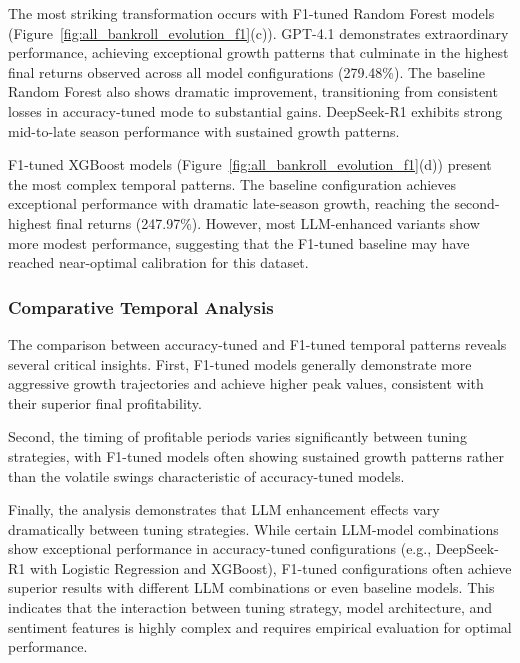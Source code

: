 \documentclass[conference]{IEEEtran}
\begin{document}
The most striking transformation occurs with F1-tuned Random Forest models (Figure~\ref{fig:all_bankroll_evolution_f1}(c)). GPT-4.1 demonstrates extraordinary performance, achieving exceptional growth patterns that culminate in the highest final returns observed across all model configurations (279.48\%). The baseline Random Forest also shows dramatic improvement, transitioning from consistent losses in accuracy-tuned mode to substantial gains. DeepSeek-R1 exhibits strong mid-to-late season performance with sustained growth patterns.

F1-tuned XGBoost models (Figure~\ref{fig:all_bankroll_evolution_f1}(d)) present the most complex temporal patterns. The baseline configuration achieves exceptional performance with dramatic late-season growth, reaching the second-highest final returns (247.97\%). However, most LLM-enhanced variants show more modest performance, suggesting that the F1-tuned baseline may have reached near-optimal calibration for this dataset.

\subsubsection{Comparative Temporal Analysis}

The comparison between accuracy-tuned and F1-tuned temporal patterns reveals several critical insights. First, F1-tuned models generally demonstrate more aggressive growth trajectories and achieve higher peak values, consistent with their superior final profitability. 

Second, the timing of profitable periods varies significantly between tuning strategies, with F1-tuned models often showing sustained growth patterns rather than the volatile swings characteristic of accuracy-tuned models.


Finally, the analysis demonstrates that LLM enhancement effects vary dramatically between tuning strategies. While certain LLM-model combinations show exceptional performance in accuracy-tuned configurations (e.g., DeepSeek-R1 with Logistic Regression and XGBoost), F1-tuned configurations often achieve superior results with different LLM combinations or even baseline models. This indicates that the interaction between tuning strategy, model architecture, and sentiment features is highly complex and requires empirical evaluation for optimal performance.
\end{document}
